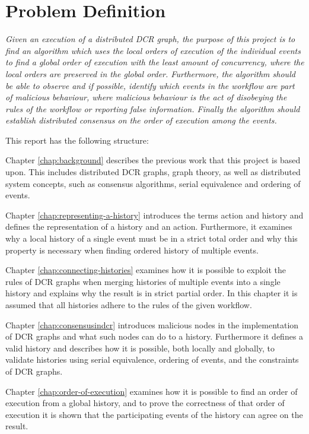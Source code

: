 \section{Problem Definition}
	\textit{Given an execution of a distributed DCR graph, the purpose of this project is to find an algorithm which uses the local orders of execution of the individual events to find a global order of execution with the least amount of concurrency, where the local orders are preserved in the global order. Furthermore, the algorithm should be able to observe and if possible, identify which events in the workflow are part of malicious behaviour, where malicious behaviour is the act of disobeying the rules of the workflow or reporting false information. Finally the algorithm should establish distributed consensus on the order of execution among the events.}
	
	\vspace{0.4cm}
	
	\newpar
	This report has the following structure:
	
	\newpar
	Chapter \ref{chap:background} describes the previous work that this project is based upon. This includes distributed DCR graphs, graph theory, as well as distributed system concepts, such as consensus algorithms, serial equivalence and ordering of events.
		
	\newpar
	Chapter \ref{chap:representing-a-history} introduces the terms action and history and defines the representation of a history and an action.
	Furthermore, it examines why a local history of a single event must be in a strict total order and why this property is necessary when finding ordered history of multiple events. 
		
	\newpar
	Chapter \ref{chap:connecting-histories} examines how it is possible to exploit the rules of DCR graphs when merging histories of multiple events into a single history and explains why the result is in strict partial order. In this chapter it is assumed that all histories adhere to the rules of the given workflow.
	
	\newpar	Chapter \ref{chap:consensusindcr} introduces malicious nodes in the implementation of DCR graphs and what such nodes can do to a history. Furthermore it defines a valid history and describes how it is possible, both locally and globally, to validate histories using serial equivalence, ordering of events, and the constraints of DCR graphs.
	
    \newpar
    Chapter \ref{chap:order-of-execution} examines how it is possible to find an order of execution from a global history, and to prove the correctness of that order of execution it is shown that the participating events of the history can agree on the result.
		
	